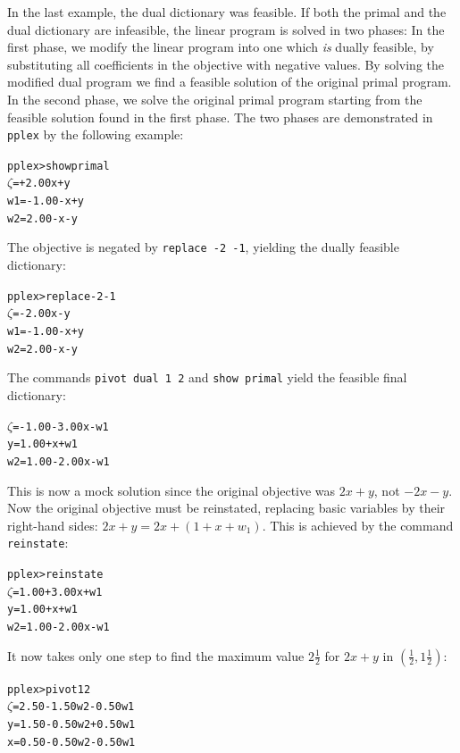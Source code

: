 \documentclass[ukenglish,a4]{article}
\begin{document}
In the last example, the dual dictionary was feasible. If both the primal and
the dual dictionary are infeasible, the linear program is solved in two phases: In the first phase,
we modify the linear program into one which \emph{is} dually feasible, by substituting all coefficients in the objective with negative values.
By solving the modified dual program we find a feasible solution of the original primal
program. In the second phase, we solve the original primal program starting from the 
feasible solution found in the first phase.
The two phases are demonstrated in \texttt{pplex} by the following example:
\begin{alltt}
pplex> show primal
 \(\zeta\) =        + 2.00x + y
w1 = - 1.00 -     x + y
w2 =   2.00 -     x - y
\end{alltt}
The objective is negated by \verb|replace -2 -1|,
yielding the dually feasible dictionary:
\begin{alltt}
pplex> replace -2 -1
 \(\zeta\)  =        - 2.00x - y
w1 = - 1.00 -     x + y
w2 =   2.00 -     x - y
\end{alltt}
The commands \verb|pivot dual 1 2| and \verb|show primal|
yield the feasible final dictionary:
\begin{alltt}
 \(\zeta\) = - 1.00 - 3.00x - w1
 y =   1.00 +     x + w1
w2 =   1.00 - 2.00x - w1
\end{alltt}
This is now a mock solution since the original objective was $2x+y$,
not $-2x-y$. Now the original objective must be reinstated,
replacing basic variables by their right-hand sides: $2x+y = 2x+(1+x+w_1)$.
This is achieved by the command \verb|reinstate|:
\begin{alltt}
pplex> reinstate
 \(\zeta\) = 1.00 + 3.00x + w1
 y = 1.00 +     x + w1
w2 = 1.00 - 2.00x - w1
\end{alltt}
It now takes only one step to find the maximum value $2\frac{1}{2}$ 
for $2x+y$ in $(\frac{1}{2},1\frac{1}{2})$:

\begin{alltt}
pplex> pivot 1 2
 \(\zeta\) = 2.50 - 1.50w2 - 0.50w1
 y = 1.50 - 0.50w2 + 0.50w1
 x = 0.50 - 0.50w2 - 0.50w1
\end{alltt}
\end{document}
